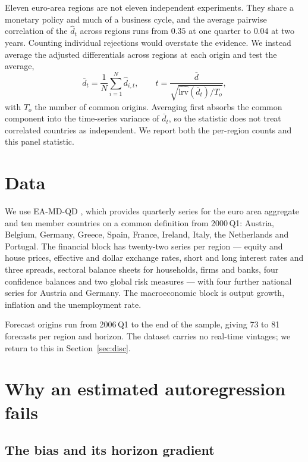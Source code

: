 \documentclass[12pt]{article}
\begin{document}
Eleven euro-area regions are not eleven independent experiments. They share a
monetary policy and much of a business cycle, and the average pairwise
correlation of the $\hat d_t$ across regions runs from $0.35$ at one quarter to
$0.04$ at two years. Counting individual rejections would overstate the
evidence. We instead average the adjusted differentials across regions at each
origin and test the average,
\begin{equation}
\bar d_t = \frac{1}{N} \sum_{i=1}^{N} \hat d_{i,t}, \qquad
t = \frac{\bar d}{\sqrt{\widehat{\mathrm{lrv}}(\bar d_t)/T_o}},
\end{equation}
with $T_o$ the number of common origins. Averaging first absorbs the common
component into the time-series variance of $\bar d_t$, so the statistic does
not treat correlated countries as independent. We report both the per-region
counts and this panel statistic.

\section{Data}

We use EA-MD-QD \citep{barigozzi2024, eamdqd}, which provides quarterly series
for the euro area aggregate and ten member countries on a common definition
from 2000\,Q1: Austria, Belgium, Germany, Greece, Spain, France, Ireland, Italy, the
Netherlands and Portugal. The financial block has twenty-two series per region
--- equity and house prices, effective and dollar exchange rates, short and
long interest rates and three spreads, sectoral balance sheets for households,
firms and banks, four confidence balances and two global risk measures ---
with four further national series for Austria and Germany. The macroeconomic
block is output growth, inflation and the unemployment rate.

Forecast origins run from 2006\,Q1 to the end of the sample, giving 73 to 81
forecasts per region and horizon. The dataset carries no real-time vintages; we
return to this in Section~\ref{sec:disc}.

\section{Why an estimated autoregression fails}
\label{sec:why}

\subsection{The bias and its horizon gradient}
\end{document}
